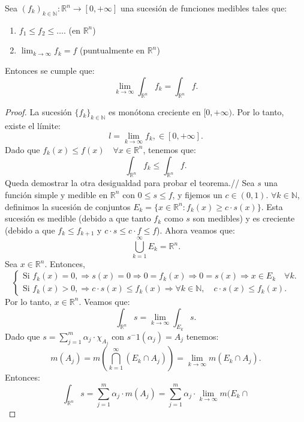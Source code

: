 \begin{teorema} 
    Sea $(f_k)_{k \in \mathbb{N}} : \mathbb{R}^n \to [0, +\infty]$ una sucesión de funciones medibles tales que:
    \begin{enumerate}
        \item $f_1 \leq f_2 \leq \dots$. (en $\mathbb{R}^n$)
        \item $\lim_{k \to \infty} f_k = f$ (puntualmente en $\mathbb{R}^n$)
    \end{enumerate}
    Entonces se cumple que:
    $$\lim_{k \to \infty} \int_{\mathbb{R}^n} f_k = \int_{\mathbb{R}^n} f.$$
\end{teorema}
\begin{proof}
    La sucesión $\{ f_k \}_{k \in \mathbb{N}}$ es monótona creciente en $[0, +\infty)$.
    Por lo tanto, existe el límite:
    $$ l = \lim\limits_{k \to \infty} f_k, \in [0, +\infty].$$
    Dado que $f_k(x) \leq f(x) \quad \forall x \in \mathbb{R}^n$, tenemos que:
    $$\int_{\mathbb{R}^n} f_k \leq \int_{\mathbb{R}^n} f.$$ Queda demostrar la otra desigualdad para probar el teorema.//
    Sea $s$ una función simple y medible en $\mathbb{R}^n$ con $0 \leq s \leq f$, y fijemos un $c \in (0, 1)$.
    $\forall k \in \mathbb{N}$, definimos la sucesión de conjuntos $E_k = \{ x \in \mathbb{R}^n : f_k(x) \geq c \cdot s(x) \}$. Esta sucesión es medible (debido a que tanto $f_k$ como $s$ son medibles) y es creciente (debido a que $f_k \leq f_{k+1}$ y $c \cdot s \leq c \cdot f \leq f$).
    Ahora veamos que:
    $$
        \bigcup\limits_{k=1}^{\infty} E_k = \mathbb{R}^n.
    $$
    Sea $x \in \mathbb{R}^n$. Entonces,
    \[
        \begin{cases}
            \text{Si } f_k(x) = 0, \Rightarrow s(x) = 0 \Rightarrow 0 = f_k(x) \Rightarrow 0 = s(x) \Rightarrow x \in E_k \quad \forall k. \\
            \text{Si } f_k(x) > 0, \Rightarrow c \cdot s(x) \leq f_k(x) \Rightarrow \forall k \in \mathbb{N}, \quad c \cdot s(x) \leq f_k(x).
        \end{cases}
    \]
    Por lo tanto, $x \in \mathbb{R}^n$. Veamos que: $$\int_{\mathbb{R}^n} s =
        \lim\limits_{k \to \infty} \int_{E_k} s.$$ Dado que $s = \sum_{j=1}^{m}
        \alpha_j \cdot \chi_{A_j}$ con $s^-1(\alpha_j) = A_j$ tenemos: $$ m(A_j) =
        m(\bigcap_{k = 1}^{\infty}(E_k\cap A_j)) = \lim\limits_{k \to \infty} m(E_k
        \cap A_j). $$ Entonces:$$\int_{\mathbb{R}^n} s = \sum_{j=1}^{m} \alpha_j \cdot
        m(A_j) = \sum_{j=1}^{m} \alpha_j \cdot \lim\limits_{k \to \infty} m(E_k \cap
$$
\end{proof}
